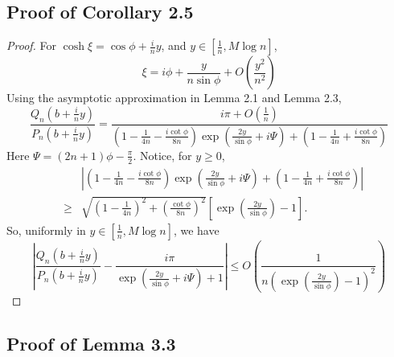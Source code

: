 \documentclass[11pt]{article}
\begin{document}
\subsection{Proof of Corollary 2.5}
\begin{proof}
    For $\cosh \xi = \cos \phi +\frac{i}{n}y$, and $ y \in \left[\frac{1}{n}, M \log n\right]$,
    \begin{equation}
        \xi = i\phi + \frac{y}{n\sin \phi} + O(\frac{y^2}{n^2})
    \end{equation}
    Using the asymptotic approximation in Lemma 2.1 and Lemma 2.3,
    \begin{equation}
    \frac{Q_n(b +\frac{i}{n}y)}{P_n(b +\frac{i}{n}y)} = \frac{i\pi +O(\frac{1}{n})}{\left(1 - \frac{1}{4n} - \frac{i\cot\phi}{8n}\right)\exp\left(\frac{2y}{\sin\phi}+i\Psi\right) + \left(1 - \frac{1}{4n} + \frac{i\cot\phi}{8n}\right) }
\end{equation}
Here $\Psi = (2n+1)\phi-\frac{\pi}{2}$. Notice, for $ y \geq 0$, 
\begin{eqnarray}
    &&\left|\left(1 - \frac{1}{4n} - \frac{i\cot\phi}{8n}\right)\exp\left(\frac{2y}{\sin\phi}+i\Psi\right) + \left(1 - \frac{1}{4n} + \frac{i\cot\phi}{8n}\right)\right| \nonumber\\
    &\geq & \sqrt{(1 - \frac{1}{4n})^2 + (\frac{\cot\phi}{8n})^2} \left[\exp\left(\frac{2y}{\sin\phi}\right)-1\right]. 
\end{eqnarray}
So, uniformly in $ y \in \left[\frac{1}{n}, M \log n\right]$, we have
\begin{equation}
    \left|\frac{Q_n(b +\frac{i}{n}y)}{P_n(b +\frac{i}{n}y)} - \frac{i\pi }{\exp\left(\frac{2y}{\sin\phi}+i\Psi\right) + 1 } \right| \leq O\left(\frac{1}{n \left(\exp\left(\frac{2y}{\sin\phi}\right)-1\right)^2}\right)
\end{equation}
\end{proof}

\subsection{Proof of Lemma 3.3}
\end{document}
